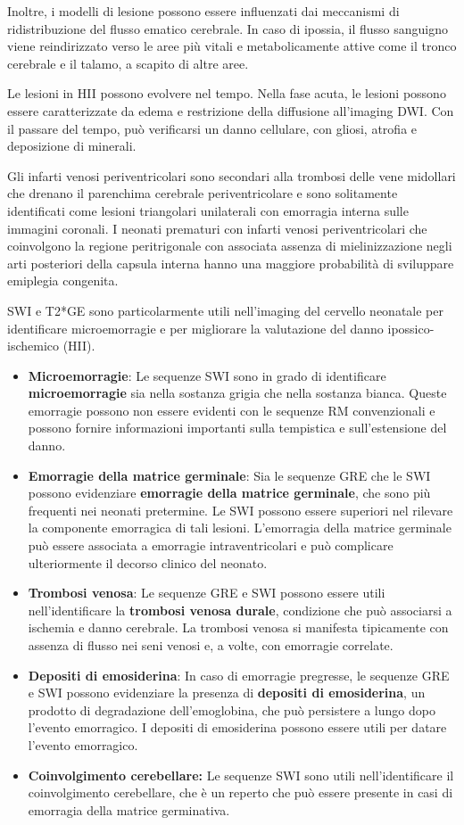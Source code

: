 Inoltre, i modelli di lesione possono essere influenzati dai meccanismi di ridistribuzione del flusso ematico cerebrale. In caso di ipossia, il flusso sanguigno viene reindirizzato verso le aree più vitali e metabolicamente attive come il tronco cerebrale e il talamo, a scapito di altre aree.

Le lesioni in HII possono evolvere nel tempo. Nella fase acuta, le lesioni possono essere caratterizzate da edema e restrizione della diffusione all'imaging DWI. Con il passare del tempo, può verificarsi un danno cellulare, con gliosi, atrofia e deposizione di minerali.

Gli infarti venosi periventricolari sono secondari alla trombosi delle vene midollari che drenano il parenchima cerebrale periventricolare e sono solitamente identificati come lesioni triangolari unilaterali con emorragia interna sulle immagini coronali. I neonati prematuri con infarti venosi periventricolari che coinvolgono la regione peritrigonale con associata assenza di mielinizzazione negli arti posteriori della capsula interna hanno una maggiore probabilità di sviluppare emiplegia congenita.

SWI e T2*GE sono particolarmente utili nell'imaging del cervello neonatale per identificare microemorragie e per migliorare la valutazione del danno ipossico-ischemico (HII).

\begin{itemize}
	\tightlist
	\item
	\textbf{Microemorragie}: Le sequenze SWI sono in grado di identificare \textbf{microemorragie} sia nella sostanza grigia che nella sostanza bianca. Queste emorragie possono non essere evidenti con le sequenze RM convenzionali e possono fornire informazioni importanti sulla tempistica e sull'estensione del danno.
	\item
	\textbf{Emorragie della matrice germinale}: Sia le sequenze GRE che le SWI possono evidenziare \textbf{emorragie della matrice germinale}, che sono più frequenti nei neonati pretermine. Le SWI possono essere superiori nel rilevare la componente emorragica di tali lesioni. L'emorragia della matrice germinale può essere associata a emorragie intraventricolari e può complicare ulteriormente il decorso clinico del neonato.
	\item
	\textbf{Trombosi venosa}: Le sequenze GRE e SWI possono essere utili nell'identificare la \textbf{trombosi venosa durale}, condizione che può associarsi a ischemia e danno cerebrale. La trombosi venosa si manifesta tipicamente con assenza di flusso nei seni venosi e, a volte, con emorragie correlate.
	\item
	\textbf{Depositi di emosiderina}: In caso di emorragie pregresse, le sequenze GRE e SWI possono evidenziare la presenza di \textbf{depositi di emosiderina}, un prodotto di degradazione dell'emoglobina, che può persistere a lungo dopo l'evento emorragico. I depositi di emosiderina possono essere utili per datare l'evento emorragico.
	\item
	\textbf{Coinvolgimento cerebellare:} Le sequenze SWI sono utili nell'identificare il coinvolgimento cerebellare, che è un reperto che può essere presente in casi di emorragia della matrice germinativa.
\end{itemize}

